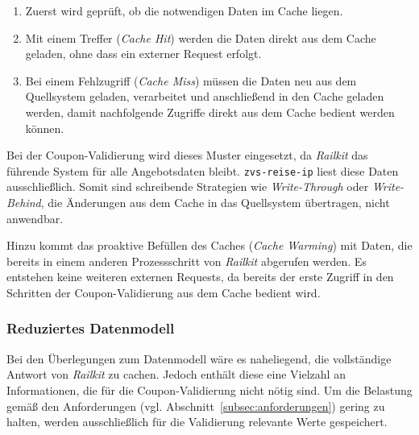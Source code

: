 \begin{enumerate}
    \item Zuerst wird geprüft, ob die notwendigen Daten im Cache liegen.
    \item Mit einem Treffer (\textit{Cache Hit}) werden die Daten direkt aus dem Cache geladen, ohne dass ein externer Request erfolgt.
    \item Bei einem Fehlzugriff (\textit{Cache Miss}) müssen die Daten neu aus dem Quellsystem geladen, verarbeitet und anschließend in den Cache geladen werden, damit nachfolgende Zugriffe direkt aus dem Cache bedient werden können.
\end{enumerate}

Bei der Coupon-Validierung wird dieses Muster eingesetzt, da \textit{Railkit} das führende System für alle Angebotsdaten bleibt. \texttt{zvs-reise-ip} liest diese Daten ausschließlich. Somit sind schreibende Strategien wie \textit{Write-Through} oder \textit{Write-Behind}, die Änderungen aus dem Cache in das Quellsystem übertragen, nicht anwendbar.

Hinzu kommt das proaktive Befüllen des Caches (\textit{Cache Warming}) mit Daten, die bereits in einem anderen Prozessschritt von \textit{Railkit} abgerufen werden. Es entstehen keine weiteren externen Requests, da bereits der erste Zugriff in den Schritten der Coupon-Validierung aus dem Cache bedient wird.


\subsubsection{Reduziertes Datenmodell}
\label{subsubsec:datenmodell}

Bei den Überlegungen zum Datenmodell wäre es naheliegend, die vollständige Antwort von \textit{Railkit} zu cachen. Jedoch enthält diese eine Vielzahl an Informationen, die für die Coupon-Validierung nicht nötig sind. Um die Belastung gemäß den Anforderungen (vgl. Abschnitt~\ref{subsec:anforderungen}) gering zu halten, werden ausschließlich für die Validierung relevante Werte gespeichert. %

